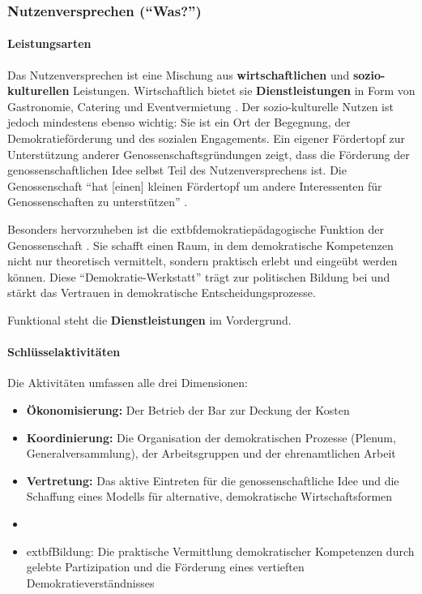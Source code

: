 \subsubsection{Nutzenversprechen (\enquote{Was?})}

\paragraph{Leistungsarten}
Das Nutzenversprechen ist eine Mischung aus \textbf{wirtschaftlichen} und \textbf{sozio-kulturellen} Leistungen. Wirtschaftlich bietet sie \textbf{Dienstleistungen} in Form von Gastronomie, Catering und Eventvermietung \parencite{SatzungTRINKGENOSSE2019}. Der sozio-kulturelle Nutzen ist jedoch mindestens ebenso wichtig: Sie ist ein Ort der Begegnung, der Demokratieförderung und des sozialen Engagements. Ein eigener Fördertopf zur Unterstützung anderer Genossenschaftsgründungen zeigt, dass die Förderung der genossenschaftlichen Idee selbst Teil des Nutzenversprechens ist. Die Genossenschaft \enquote{hat [einen] kleinen Fördertopf um andere Interessenten für Genossenschaften zu unterstützen} \parencite{mederInterviewZurGeschaftsmodellanalyse2025}.

Besonders hervorzuheben ist die 	extbf{demokratiepädagogische Funktion} der Genossenschaft \parencite{GenossenschaftsartikelUeberTrinkGenosse2022}. Sie schafft einen Raum, in dem demokratische Kompetenzen nicht nur theoretisch vermittelt, sondern praktisch erlebt und eingeübt werden können. Diese \enquote{Demokratie-Werkstatt} trägt zur politischen Bildung bei und stärkt das Vertrauen in demokratische Entscheidungsprozesse.

Funktional steht die \textbf{Dienstleistungen} im Vordergrund.

\paragraph{Schlüsselaktivitäten}
Die Aktivitäten umfassen alle drei Dimensionen:
\begin{itemize}
\item \textbf{Ökonomisierung:} Der Betrieb der Bar zur Deckung der Kosten
\item \textbf{Koordinierung:} Die Organisation der demokratischen Prozesse (Plenum, Generalversammlung), der Arbeitsgruppen und der ehrenamtlichen Arbeit \parencite{SatzungTRINKGENOSSE2019}
\item \textbf{Vertretung:} Das aktive Eintreten für die genossenschaftliche Idee und die Schaffung eines Modells für alternative, demokratische Wirtschaftsformen
\item \item 	extbf{Bildung:} Die praktische Vermittlung demokratischer Kompetenzen durch gelebte Partizipation und die Förderung eines vertieften Demokratieverständnisses \parencite{GenossenschaftsartikelUeberTrinkGenosse2022}
\end{itemize}

